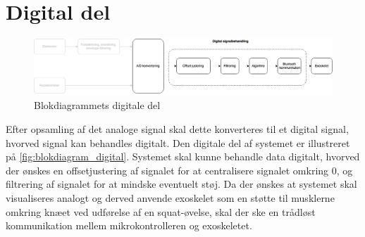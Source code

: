 \section{Digital del}
\begin{figure}[H]
\centering
\includegraphics[width=1\textwidth]{figures/implementering/Blokdiagram_digital.png}
\caption{Blokdiagrammets digitale del}
\label{fig:blokdiagram_digital}
\end{figure}

\noindent
Efter opsamling af det analoge signal skal dette konverteres til et digital signal, hvorved signal kan behandles digitalt. Den digitale del af systemet er illustreret på \autoref{fig:blokdiagram_digital}. Systemet skal kunne behandle data digitalt, hvorved der ønskes en offsetjustering af signalet for at centralisere signalet omkring 0, og filtrering af signalet for at mindske eventuelt støj. Da der ønskes at systemet skal visualiseres analogt og derved anvende exoskelet som en støtte til musklerne omkring knæet ved udførelse af en squat-øvelse, skal der ske en trådløst kommunikation mellem mikrokontrolleren og exoskeletet. 




